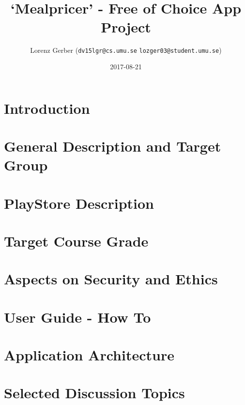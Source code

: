 \documentclass[a4paper,11pt,twoside]{article}
\title{`Mealpricer' - Free of Choice App Project}
\author{Lorenz Gerber ({\tt{dv15lgr@cs.umu.se}} {\tt{lozger03@student.umu.se}})}
\date{2017-08-21}
\begin{document}
\lstset{language=C}
\maketitle
\thispagestyle{empty}
\newpage
\tableofcontents
\thispagestyle{empty}
\newpage

\clearpage
{}

\section{Introduction}
\section{General Description and Target Group}
\section{PlayStore Description}
\section{Target Course Grade}
\section{Aspects on Security and Ethics}
\section{User Guide - How To}
\section{Application Architecture}
\section{Selected Discussion Topics}
\end{document}
